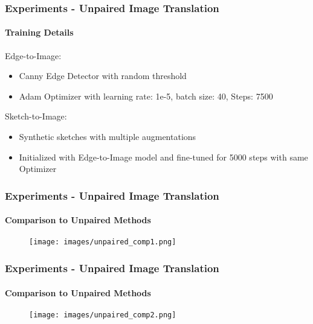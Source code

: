 \begin{frame}
    \frametitle{Experiments - Unpaired Image Translation}
    \framesubtitle{Training Details}
        Edge-to-Image:
        \begin{itemize}
            \item Canny Edge Detector with random threshold
            \item Adam Optimizer with learning rate: 1e-5, batch size: 40, Steps: 7500
        \end{itemize}
        Sketch-to-Image:
        \begin{itemize}
            \item Synthetic sketches with multiple augmentations
            \item Initialized with Edge-to-Image model and fine-tuned for 5000 steps with same Optimizer
        \end{itemize}
\end{frame}

\begin{frame}
    \frametitle{Experiments - Unpaired Image Translation}
    \framesubtitle{Comparison to Unpaired Methods}
    \begin{figure}
        \centering
        \texttt{[image: images/unpaired\_comp1.png]}
        
    \end{figure}
\end{frame}

\begin{frame}
    \frametitle{Experiments - Unpaired Image Translation}
    \framesubtitle{Comparison to Unpaired Methods}
    \begin{figure}
        \centering
        \texttt{[image: images/unpaired\_comp2.png]}
            
    \end{figure}
\end{frame}
